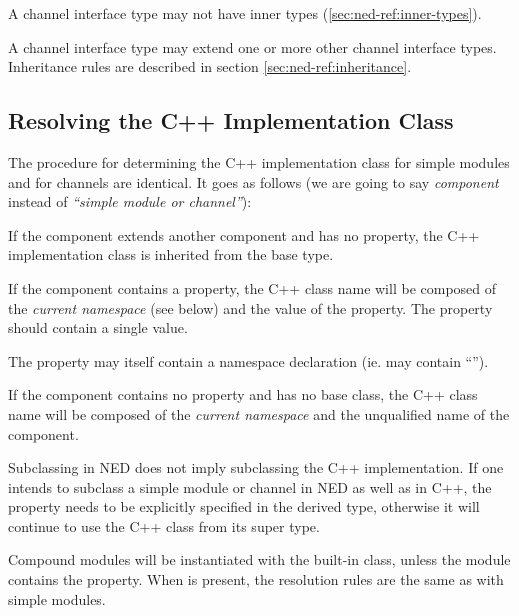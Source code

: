 A channel interface type may not have inner types (\ref{sec:ned-ref:inner-types}).

A channel interface type may extend one or more other channel interface types.
Inheritance rules are described in section \ref{sec:ned-ref:inheritance}.



\subsection{Resolving the C++ Implementation Class}
\label{sec:ned-ref:resolving-cpp-class}

The procedure for determining the C++ implementation class for simple modules
and for channels are identical. It goes as follows (we are going to say
\textit{component} instead of \textit{``simple module or channel''}):

If the component extends another component and has no 
property, the C++ implementation class is inherited from the base type.

If the component contains a  property, the C++ class name
will be composed of the \textit{current namespace} (see below) and the
value of the  property. The  property should
contain a single value.

\begin{note}
    The  property may itself contain a namespace declaration (ie.
    may contain ``\ttt{::}'').
\end{note}

If the component contains no  property and has no base
class, the C++ class name will be composed of the \textit{current namespace} and the
unqualified name of the component.

\begin{important}
    Subclassing in NED does not imply subclassing the C++ implementation. If one
    intends to subclass a simple module or channel in NED as well as in C++, the
     property needs to be explicitly specified in the derived type,
    otherwise it will continue to use the C++ class from its super type.
\end{important}

Compound modules will be instantiated with the built-in  class,
unless the module contains the  property. When  is present,
the resolution rules are the same as with simple modules.


